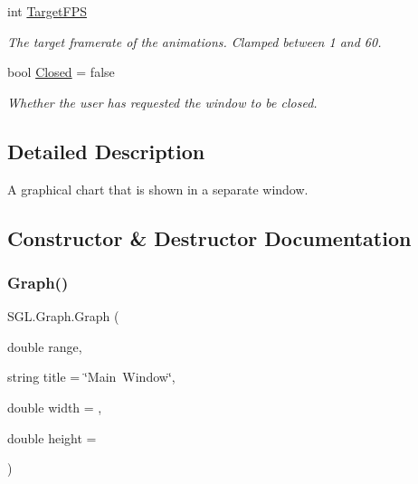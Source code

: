 \begin{DoxyCompactItemize}
int \mbox{\hyperlink{class_s_g_l_1_1_graph_a60259b98072e0e872544a1175e4da5d5}{Target\+F\+PS}}
\begin{DoxyCompactList}\small\item\em The target framerate of the animations. Clamped between 1 and 60. \end{DoxyCompactList}\item 
bool \mbox{\hyperlink{class_s_g_l_1_1_graph_af02de749db6b6d1988e22dc598661def}{Closed}} = false
\begin{DoxyCompactList}\small\item\em Whether the user has requested the window to be closed. \end{DoxyCompactList}\end{DoxyCompactItemize}


\subsection{Detailed Description}
A graphical chart that is shown in a separate window. 



\subsection{Constructor \& Destructor Documentation}
\mbox{\label{class_s_g_l_1_1_graph_ae49041037b01a96e44314f7b3b9b6166}} 
\subsubsection{\texorpdfstring{Graph()}{Graph()}}
{\footnotesize\ttfamily S\+G\+L.\+Graph.\+Graph (\begin{DoxyParamCaption}\item[{double}]{range,  }\item[{string}]{title = {\ttfamily \char`\"{}Main~Window\char`\"{}},  }\item[{double}]{width = {},  }\item[{double}]{height = {} }\end{DoxyParamCaption})\hspace{0.3cm}{\ttfamily [inline]}}



